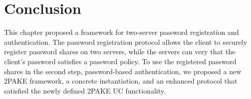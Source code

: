 









\section{Conclusion}
This chapter proposed a framework for two-server password registration and authentication.
The password registration protocol allows the client to securely register password shares on two servers, while the servers can very that the client's password satisfies a password policy.
To use the registered password shares in the second step, password-based authentication, we proposed a new \ac{2PAKE} framework, a concrete instantiation, and an enhanced protocol that satisfied the newly defined \ac{2PAKE} \ac{UC} functionality.
